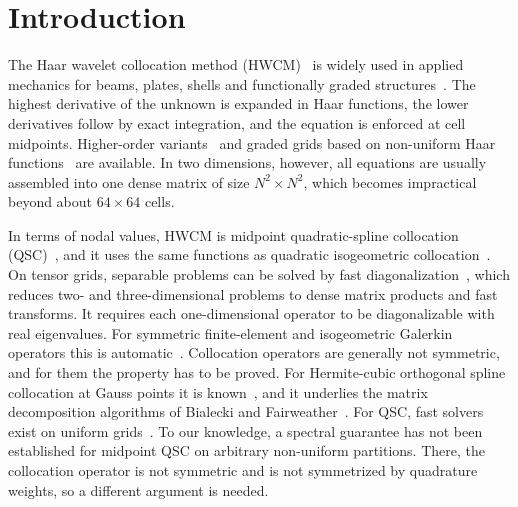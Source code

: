 \documentclass[smallextended,envcountsame]{svjour3}
\begin{document}
\section{Introduction}\label{sec:intro}
The Haar wavelet collocation method (HWCM)~\cite{chen1997haar,lepik2005numerical,lepik2011solving,lepik2014book}
is widely used in applied mechanics for beams, plates, shells and functionally graded
structures~\cite{majak2015accuracy,majak2015convergence,majak2018higher}. The highest derivative of the
unknown is expanded in Haar functions, the lower derivatives follow by exact integration, and the
equation is enforced at cell midpoints. Higher-order variants~\cite{majak2018higher,ratas2021solving} and
graded grids based on non-uniform Haar functions~\cite{dubeau2004nonuniform,lepik2008nonuniform,oruc2019nonuniform}
are available. In two dimensions, however, all equations are usually assembled into one dense matrix of
size $N^2\times N^2$, which becomes impractical beyond about $64\times64$ cells.

In terms of nodal values, HWCM is midpoint quadratic-spline collocation
(QSC)~\cite{houstis1988quadratic,christara1994quadratic,christara2006optimal}, and it uses the same
functions as quadratic isogeometric collocation~\cite{auricchio2010isogeometric,schillinger2013isogeometric}.
On tensor grids, separable problems can be solved by fast diagonalization~\cite{lynch1964direct}, which
reduces two- and three-dimensional problems to dense matrix products and fast transforms. It requires
each one-dimensional operator to be diagonalizable with real eigenvalues. For symmetric finite-element
and isogeometric Galerkin operators this is automatic~\cite{sangalli2016isogeometric}. Collocation
operators are generally not symmetric, and for them the property has to be proved. For Hermite-cubic
orthogonal spline collocation at Gauss points it is known~\cite{dyksen1987tensor,sun1999spectral}, and it
underlies the matrix decomposition algorithms of Bialecki and Fairweather~\cite{bialecki1995matrix,bialecki2011matrix}.
For QSC, fast solvers exist on uniform grids~\cite{christara2002fast}. To our knowledge, a spectral
guarantee has not been established for midpoint QSC on arbitrary non-uniform partitions. There, the
collocation operator is not symmetric and is not symmetrized by quadrature weights, so a different
argument is needed.
\end{document}

